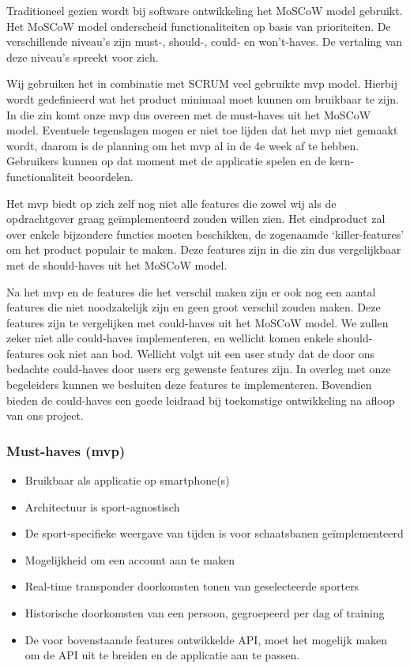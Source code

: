 \newcommand{\programmavaneisen}{}
\label{sec:programma-van-eisen}

Traditioneel gezien wordt bij software ontwikkeling het MoSCoW model gebruikt. Het MoSCoW model onderscheid functionaliteiten op basis van prioriteiten. De verschillende niveau's zijn must-, should-, could- en won't-haves. De vertaling van deze niveau's spreekt voor zich.

Wij gebruiken het in combinatie met SCRUM veel gebruikte \acf{mvp} model. Hierbij wordt gedefinieerd wat het product minimaal moet kunnen om bruikbaar te zijn. In die zin komt onze \ac{mvp} dus overeen met de must-haves uit het MoSCoW model. Eventuele tegenslagen mogen er niet toe lijden dat het \ac{mvp} niet gemaakt wordt, daarom is de planning om het \ac{mvp} al in de 4e week af te hebben. Gebruikers kunnen op dat moment met de applicatie spelen en de kern-functionaliteit beoordelen.

Het \ac{mvp} biedt op zich zelf nog niet alle features die zowel wij als de opdrachtgever graag geïmplementeerd zouden willen zien. Het eindproduct zal over enkele bijzondere functies moeten beschikken, de zogenaamde `killer-features' om het product populair te maken. Deze features zijn in die zin dus vergelijkbaar met de should-haves uit het MoSCoW model.

Na het \ac{mvp} en de features die het verschil maken zijn er ook nog een aantal features die niet noodzakelijk zijn en geen groot verschil zouden maken. Deze features zijn te vergelijken met could-haves uit het MoSCoW model. We zullen zeker niet alle could-haves implementeren, en wellicht komen enkele should-features ook niet aan bod. Wellicht volgt uit een user study dat de door ons bedachte could-haves door users erg gewenste features zijn. In overleg met onze begeleiders kunnen we besluiten deze features te implementeren. Bovendien bieden de could-haves een goede leidraad bij toekomstige ontwikkeling na afloop van ons project.

\subsubsection{Must-haves (\ac{mvp})}

\begin{itemize}
    \item Bruikbaar als applicatie op smartphone(s)
    \item Architectuur is sport-agnostisch
    \item De sport-specifieke weergave van tijden is voor schaatsbanen geïmplementeerd
    \item Mogelijkheid om een account aan te maken
    \item Real-time transponder doorkomsten tonen van geselecteerde sporters
    \item Historische doorkomsten van een persoon, gegroepeerd per dag of training
    \item De voor bovenstaande features ontwikkelde API, moet het mogelijk maken om de API uit te breiden en de applicatie aan te passen.
\end{itemize}

